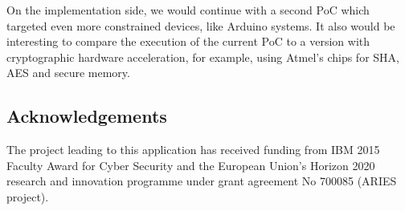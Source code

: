On the implementation side, we would continue with a second PoC which targeted even more constrained devices, like Arduino systems. %
It also would be interesting to compare the execution of the current PoC to a version with cryptographic hardware acceleration, for example, using Atmel's chips for SHA, AES and secure memory.


%


\subsection*{Acknowledgements}

The project leading to this application has received funding from IBM 2015 Faculty Award for Cyber Security and the European Union’s Horizon 2020 research and innovation programme under grant agreement No 700085 (ARIES project).
